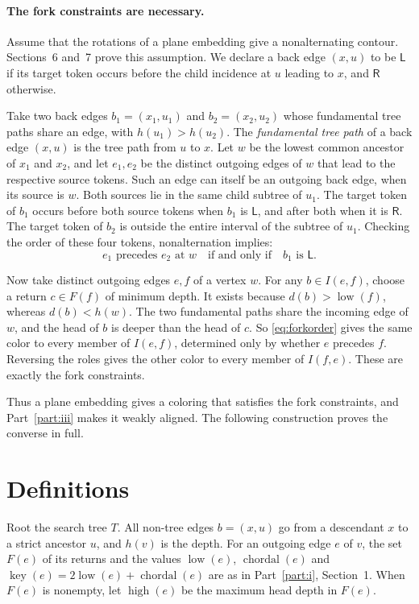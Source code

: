 \documentclass[11pt]{article}
\DeclareMathOperator{\low}{low}
\DeclareMathOperator{\high}{high}
\DeclareMathOperator{\chordal}{chordal}
\DeclareMathOperator{\key}{key}
\newcommand{\cL}{\mathsf{L}}
\newcommand{\cR}{\mathsf{R}}
\begin{document}
\paragraph{The fork constraints are necessary.}
Assume that the rotations of a plane embedding give a nonalternating contour.
Sections~6 and~7 prove this assumption. We declare a back edge $(x,u)$ to be
$\cL$ if its target token occurs before the child incidence at $u$ leading to
$x$, and $\cR$ otherwise.

Take two back edges $b_1=(x_1,u_1)$ and $b_2=(x_2,u_2)$ whose fundamental tree
paths share an edge, with $h(u_1)>h(u_2)$. The \emph{fundamental tree path} of
a back edge $(x,u)$ is the tree path from $u$ to $x$. Let $w$ be the lowest
common ancestor of $x_1$ and $x_2$, and let $e_1,e_2$ be the distinct outgoing
edges of $w$ that lead to the respective source tokens. Such an edge can itself
be an outgoing back edge, when its source is $w$. Both sources lie in the same
child subtree of $u_1$. The target token of $b_1$ occurs before both source
tokens when $b_1$ is $\cL$, and after both when it is $\cR$. The target token
of $b_2$ is outside the entire interval of the subtree of $u_1$. Checking the
order of these four tokens, nonalternation implies:
\begin{equation}\label{eq:forkorder}
e_1\text{ precedes }e_2\text{ at }w\quad\text{if and only if}\quad b_1\text{ is }\cL.
\end{equation}

Now take distinct outgoing edges $e,f$ of a vertex $w$. For any $b\in I(e,f)$,
choose a return $c\in F(f)$ of minimum depth. It exists because
$d(b)>\low(f)$, whereas $d(b)<h(w)$. The two fundamental paths share the
incoming edge of $w$, and the head of $b$ is deeper than the head of $c$. So
\eqref{eq:forkorder} gives the same color to every member of $I(e,f)$,
determined only by whether $e$ precedes $f$. Reversing the roles gives the
other color to every member of $I(f,e)$. These are exactly the fork
constraints.

Thus a plane embedding gives a coloring that satisfies the fork constraints,
and Part~\ref{part:iii} makes it weakly aligned. The following construction
proves the converse in full.

\section{Definitions}

Root the search tree $T$. All non-tree edges $b=(x,u)$ go from a descendant $x$
to a strict ancestor $u$, and $h(v)$ is the depth. For an outgoing edge $e$ of
$v$, the set $F(e)$ of its returns and the values $\low(e)$, $\chordal(e)$ and
$\key(e)=2\low(e)+\chordal(e)$ are as in Part~\ref{part:i}, Section~1. When
$F(e)$ is nonempty, let $\high(e)$ be the maximum head depth in $F(e)$.
\end{document}
